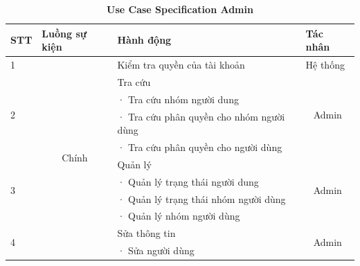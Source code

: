 \documentclass{article} %
\begin{document}
\begin{table}[H]
    \centering    
    \caption[Use Case Specification Admin]{\bfseries\fontsize{12pt}{0pt}\selectfont Use Case Specification Admin}
    \begin{tabular}{|l|c|l|c|}
        \hline
        \textbf{STT}       & \multicolumn{1}{l|}{Luồng sự kiện} & Hành động                                      & \multicolumn{1}{l|}{Tác nhân} \\ \hline
        1                  & \multirow{14}{*}{Chính}            & Kiểm tra quyền của tài khoản                   & \multicolumn{1}{l|}{Hệ thống} \\ \cline{1-1} \cline{3-4} 
        \multirow{4}{*}{2} &                                    & Tra cứu                                        & \multirow{4}{*}{Admin}        \\ 
                           &                                    & ·       Tra cứu nhóm người dung                &                               \\
                           &                                    & ·       Tra cứu phân quyền cho nhóm người dùng &                               \\
                           &                                    & ·       Tra cứu phân quyền cho người dùng      &                               \\ \cline{1-1} \cline{3-4} 
        \multirow{4}{*}{3} &                                    & Quản lý                                        & \multirow{4}{*}{Admin}        \\
                           &                                    & ·       Quản lý trạng thái người dung          &                               \\
                           &                                    & ·       Quản lý trạng thái nhóm người dùng     &                               \\
                           &                                    & ·       Quản lý nhóm người dùng                &                               \\ \cline{1-1} \cline{3-4} 
        \multirow{5}{*}{4} &                                    & Sửa thông tin                                  & \multirow{5}{*}{Admin}        \\
                           &                                    & ·       Sửa người dùng                         &                               \\

\end{tabular}
\end{table}
\end{document}
